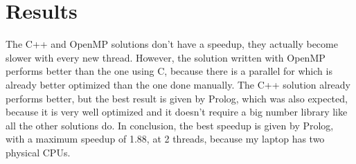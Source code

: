 \documentclass{article}
\begin{document}
\section{Results}

The C++ and OpenMP solutions don't have a speedup, they actually become slower with every new thread. However, the solution written with OpenMP performs better than the one using C, because there is a parallel for which is already better optimized than the one done manually. The C++ solution already performs better, but the best result is given by Prolog, which was also expected, because it is very well optimized and it doesn't require a big number library like all the other solutions do. In conclusion, the best speedup is given by Prolog, with a maximum speedup of 1.88, at 2 threads, because my laptop has two physical CPUs.
\end{document}
